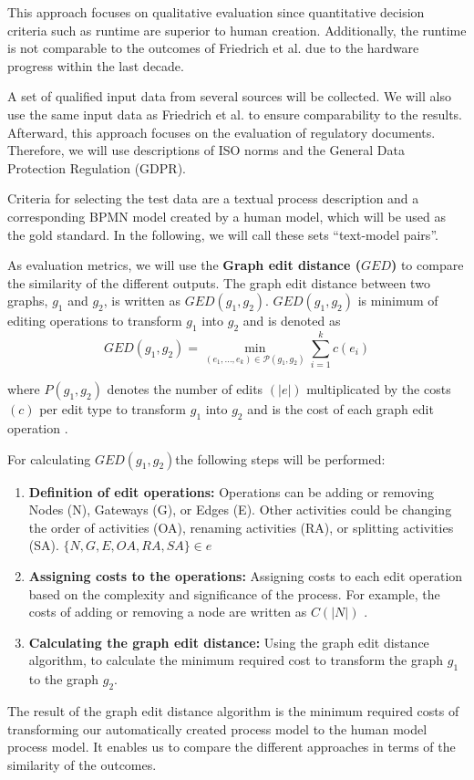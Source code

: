 This approach focuses on qualitative evaluation since quantitative decision criteria such as runtime are superior to human creation. Additionally, the runtime is not comparable to the outcomes of Friedrich et al. due to the hardware progress within the last decade. 

A set of qualified input data from several sources will be collected. We will also use the same input data as Friedrich et al. to ensure comparability to the results. Afterward, this approach focuses on the evaluation of regulatory documents. Therefore, we will use descriptions of ISO norms and the General Data Protection Regulation (GDPR).

Criteria for selecting the test data are a textual process description and a corresponding BPMN model created by a human model, which will be used as the gold standard. In the following, we will call these sets “text-model pairs”. 

As evaluation metrics, we will use the \textbf{Graph edit distance (\(GED \))} to compare the similarity of the different outputs. The graph edit distance between two graphs, \(g_1 \) and \(g_2 \), is written as \(GED\left(g_1, g_2\right) \).  \(GED\left(g_1, g_2\right) \) is minimum of editing operations to transform \(g_1 \) into \(g_2 \) and is denoted as
\begin{equation}
GED\left(g_1, g_2\right)=\min _{\left(e_1, \ldots, e_k\right) \in \mathcal{P}\left(g_1, g_2\right)} \sum_{i=1}^k c\left(e_i\right)
\end{equation}

where  \(P\left(g_1, g_2\right) \) denotes the number of edits \((|e|)\) multiplicated by the costs \((c)\) per edit type to transform  \(g_1 \)  into \(g_2 \) and is the cost of each graph edit operation \cite{abu-aishehExactGraphEdit2015}.

For calculating  \(GED\left(g_1, g_2\right) \)the following steps will be performed:

\begin{enumerate}
\item  \textbf{Definition of edit operations:} Operations can be adding or removing Nodes (N), Gateways (G), or Edges (E). Other activities could be changing the order of activities (OA), renaming activities (RA), or splitting activities (SA). \( \{N, G, E, OA , RA, SA\} \in e \) 
\item  \textbf{Assigning costs to the operations:} Assigning costs to each edit operation based on the complexity and significance of the process. For example, the costs of adding or removing a node are written as \(C(|N|)\) .
\item  \textbf{Calculating the graph edit distance:} Using the graph edit distance algorithm, to calculate the minimum required cost to transform the graph \(g_1 \)  to the graph \(g_2 \). 
\end{enumerate}
The result of the graph edit distance algorithm is the minimum required costs of transforming our automatically created process model to the human model process model. It enables us to compare the different approaches in terms of the similarity of the outcomes.

